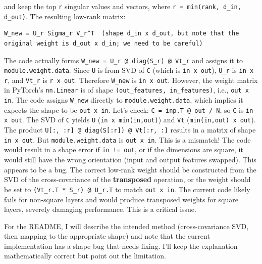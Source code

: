 and keep the top \texttt{r} singular values and vectors, where \texttt{r = min(rank, d\_in, d\_out)}. The resulting low-rank matrix:

\vspace{0.5em}
\begin{mdframed}[backgroundcolor=codebg, linecolor=codeframe, linewidth=1pt, roundcorner=4pt, innerleftmargin=2pt, innerrightmargin=5pt, innertopmargin=5pt, innerbottommargin=5pt]
\begin{lstlisting}
W_new = U_r Sigma_r V_r^T  (shape d_in x d_out, but note that the original weight is d_out x d_in; we need to be careful)
\end{lstlisting}
\end{mdframed}
\vspace{0.5em}

The code actually forms \texttt{W\_new = U\_r @ diag(S\_r) @ Vt\_r} and assigns it to \texttt{module.weight.data}. Since \texttt{U} is from SVD of \texttt{C} (which is \texttt{in x out}), \texttt{U\_r} is \texttt{in x r}, and \texttt{Vt\_r} is \texttt{r x out}. Therefore \texttt{W\_new} is \texttt{in x out}. However, the weight matrix in PyTorch's \texttt{nn.Linear} is of shape \texttt{(out\_features, in\_features)}, i.e., \texttt{out x in}. The code assigns \texttt{W\_new} directly to \texttt{module.weight.data}, which implies it expects the shape to be \texttt{out x in}. Let's check: \texttt{C = inp.T @ out / N}, so \texttt{C} is \texttt{in x out}. The SVD of \texttt{C} yields \texttt{U} (\texttt{in x min(in,out)}) and \texttt{Vt} (\texttt{min(in,out) x out}). The product \texttt{U[:, :r] @ diag(S[:r]) @ Vt[:r, :]} results in a matrix of shape \texttt{in x out}. But \texttt{module.weight.data} is \texttt{out x in}. This is a mismatch! The code would result in a shape error if \texttt{in != out}, or if the dimensions are square, it would still have the wrong orientation (input and output features swapped). This appears to be a bug. The correct low-rank weight should be constructed from the SVD of the cross-covariance of the \textbf{transposed} operation, or the weight should be set to \texttt{(Vt\_r.T * S\_r) @ U\_r.T} to match \texttt{out x in}. The current code likely fails for non-square layers and would produce transposed weights for square layers, severely damaging performance. This is a critical issue.

For the README, I will describe the intended method (cross-covariance SVD, then mapping to the appropriate shape) and note that the current implementation has a shape bug that needs fixing. I'll keep the explanation mathematically correct but point out the limitation.

